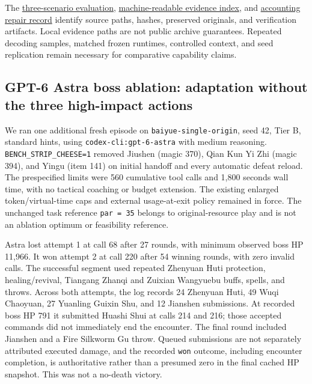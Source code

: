 \documentclass[11pt,a4paper]{article}
\begin{document}
The \href{astra-three-scenario-evaluation-2026-10-23.md}{three-scenario evaluation}, \href{astra-three-scenario-evaluation-2026-10-23.evidence.json}{machine-readable evidence index}, and \href{cli-accounting-repair-2026-10-23.md}{accounting repair record} identify source paths, hashes, preserved originals, and verification artifacts. Local evidence paths are not public archive guarantees. Repeated decoding samples, matched frozen runtimes, controlled context, and seed replication remain necessary for comparative capability claims.

\subsection{\texorpdfstring{GPT-6 Astra boss ablation: adaptation without the three high-impact actions}{GPT-6 Astra boss ablation: adaptation without the three high-impact actions}}

We ran one additional fresh episode on \texttt{baiyue\allowbreak{}-\allowbreak{}single\allowbreak{}-\allowbreak{}origin}, seed 42, Tier B, standard hints, using \texttt{codex\allowbreak{}-\allowbreak{}cli\allowbreak{}:\allowbreak{}gpt\allowbreak{}-\allowbreak{}6\allowbreak{}-\allowbreak{}astra} with medium reasoning. \texttt{BENCH\allowbreak{}\_\allowbreak{}STRIP\allowbreak{}\_\allowbreak{}CHEESE\allowbreak{}=\allowbreak{}1} removed Jiushen (magic 370), Qian Kun Yi Zhi (magic 394), and Yingu (item 141) on initial handoff and every automatic defeat reload. The prespecified limits were 560 cumulative tool calls and 1,800 seconds wall time, with no tactical coaching or budget extension. The existing enlarged token/virtual-time caps and external usage-at-exit policy remained in force. The unchanged task reference \texttt{par\allowbreak{} \allowbreak{}=\allowbreak{} \allowbreak{}35} belongs to original-resource play and is not an ablation optimum or feasibility reference.

Astra lost attempt 1 at call 68 after 27 rounds, with minimum observed boss HP 11,966. It won attempt 2 at call 220 after 54 winning rounds, with zero invalid calls. The successful segment used repeated Zhenyuan Huti protection, healing/revival, Tiangang Zhanqi and Zuixian Wangyuebu buffs, spells, and throws. Across both attempts, the log records 24 Zhenyuan Huti, 49 Wuqi Chaoyuan, 27 Yuanling Guixin Shu, and 12 Jianshen submissions. At recorded boss HP 791 it submitted Huashi Shui at calls 214 and 216; those accepted commands did not immediately end the encounter. The final round included Jianshen and a Fire Silkworm Gu throw. Queued submissions are not separately attributed executed damage, and the recorded \texttt{won} outcome, including encounter completion, is authoritative rather than a presumed zero in the final cached HP snapshot. This was not a no-death victory.
\end{document}
